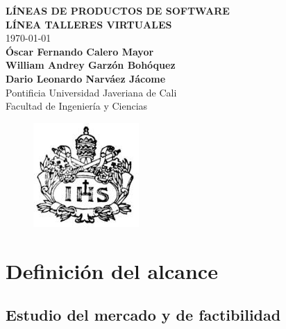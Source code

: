 \documentclass[10pt,a4paper,openany]{book}
\begin{document}
\begin{titlepage}
	\begin{center}
		{\Large \textbf{LÍNEAS DE PRODUCTOS DE SOFTWARE}}\\
		\vspace{3cm}
		{\Large \textbf{LÍNEA TALLERES VIRTUALES}}\\
		\vspace{3cm}
		{\large \today}\\
		\vspace{3cm}
		{\large \textbf{Óscar Fernando Calero Mayor}}\\
		{\large \textbf{William Andrey Garzón Bohóquez}}\\
		{\large \textbf{Dario Leonardo Narváez Jácome}}\\
		\vspace{1cm}
		{\large Pontificia Universidad Javeriana de Cali}\\
		{\large Facultad de Ingeniería y Ciencias}\\
		\begin{figure}[h]
			\centering
			\includegraphics[scale=0.8]{logo}
		\end{figure}
	\end{center} 
\end{titlepage}

\tableofcontents

\chapter{Definición del alcance}
\section{Estudio del mercado y de factibilidad}
\end{document}

